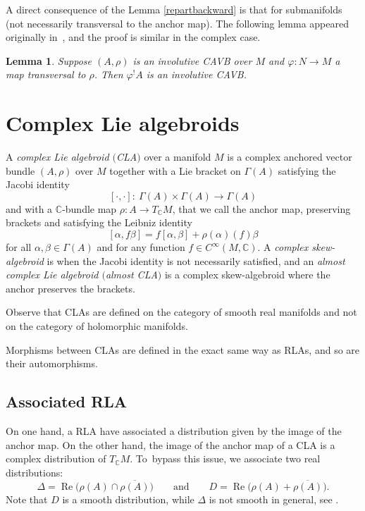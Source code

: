 \documentclass[11pt]{article}
\numberwithin{equation}{section}
\numberwithin{equation}{section}
\newtheorem{Lemma}[Theorem]{Lemma}
\newcommand{\C}{{\mathbb{C}}}
\DeclareMathOperator{\re}{Re}
\DeclareMathOperator{\real}{re}
\begin{document}
A direct consequence of the Lemma \ref{repartbackward} is that \smash{$\bigl(\iota^! A\bigr)^{\real}=\iota^! (A^{\real})$} for submanifolds  (not necessarily transversal to the anchor map).
The following lemma appeared originally in~\cite{bursztyn2019splitting}, and the proof is similar in the complex case.
\begin{Lemma}
   Suppose $(A,\rho)$ is an involutive CAVB over $M$ and $\varphi\colon N\to M$ a map transversal to $\rho$. Then $\varphi^! A$ is an involutive CAVB.
\end{Lemma}

 \section{Complex Lie algebroids}\label{CLA}
\begin{Definition}%
A {\em complex Lie algebroid $($CLA$)$} over a manifold $M$ is a complex anchored vector bundle $(A, \rho)$ over $M$ together with a Lie bracket on $\Gamma(A)$ satisfying the Jacobi identity
\[[\cdot,\cdot]\colon \ \Gamma(A)\times \Gamma(A)\to\Gamma(A)\]
 and with a $\C$-bundle map $\rho\colon A\to T_{\C}M$, that we call the anchor map, preserving brackets and satisfying the Leibniz identity
 \[[\alpha,f \beta]=f[\alpha,\beta]+\rho(\alpha)(f)\beta\]
 for all $\alpha,\beta\in \Gamma(A)$ and for any function $f\in C^{\infty}(M,\C)$. A {\em complex skew-algebroid} is when the Jacobi identity is not necessarily satisfied, and an {\em almost complex Lie algebroid $($almost CLA$)$} is a complex skew-algebroid where the anchor preserves the brackets.
\end{Definition}

\begin{Remark}
Observe that CLAs are defined on the category of smooth real manifolds and not on the category of holomorphic manifolds.
\end{Remark}
Morphisms between CLAs are defined in the exact same way as RLAs, and so are their automorphisms.

\setcounter{Theorem}{3}
\subsection{Associated RLA}%
On one hand, a RLA have associated a distribution given by the image of the anchor map. On the other hand, the image of the anchor map of a CLA is a complex distribution of $T_{\C}M$. To~bypass this issue, we associate two real distributions:
\begin{equation}\label{real_distributions}
\Delta=\re \bigl(\rho(A)\cap \overline{\rho(A)}\bigr)\qquad\text{and} \qquad D=\re \bigl(\rho(A) + \overline{\rho(A)}\bigr).
\end{equation}
Note that $D$ is a smooth distribution, while $\Delta$ is not smooth in general, see \cite[Example 6.1]{aguero2022complex}.
\end{document}
